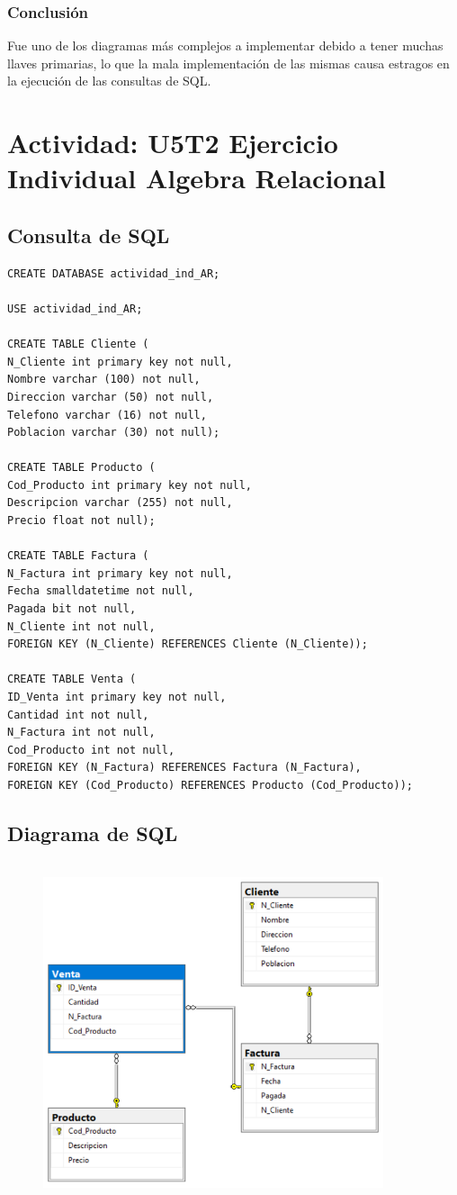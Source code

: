 \documentclass[a4paper, 12pt]{article}
\begin{document}
\begin{justify}
        \subsubsection{Conclusión}
        \justify
        Fue uno de los diagramas más complejos a implementar debido a tener muchas llaves primarias, lo que la mala implementación de las mismas causa estragos en la ejecución de las consultas de SQL.
        \section{Actividad: U5T2 Ejercicio Individual Algebra Relacional}
        \justify
        \subsection{Consulta de SQL}
\begin{verbatim}
CREATE DATABASE actividad_ind_AR;

USE actividad_ind_AR;

CREATE TABLE Cliente (
N_Cliente int primary key not null,
Nombre varchar (100) not null,
Direccion varchar (50) not null,
Telefono varchar (16) not null,
Poblacion varchar (30) not null);

CREATE TABLE Producto (
Cod_Producto int primary key not null,
Descripcion varchar (255) not null,
Precio float not null);

CREATE TABLE Factura (
N_Factura int primary key not null,
Fecha smalldatetime not null,
Pagada bit not null,
N_Cliente int not null,
FOREIGN KEY (N_Cliente) REFERENCES Cliente (N_Cliente));

CREATE TABLE Venta (
ID_Venta int primary key not null,
Cantidad int not null,
N_Factura int not null,
Cod_Producto int not null,
FOREIGN KEY (N_Factura) REFERENCES Factura (N_Factura),
FOREIGN KEY (Cod_Producto) REFERENCES Producto (Cod_Producto));
\end{verbatim}
        \subsection{Diagrama de SQL}
        \begin{figure}[H]
            \centering
            \includegraphics[width=10cm,height=10cm]{sql_u5t2.PNG}
        \end{figure}

\end{justify}
\end{document}
